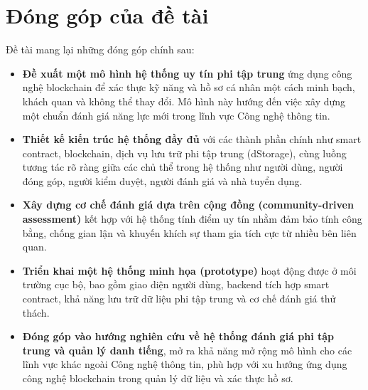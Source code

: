 \section{Đóng góp của đề tài}
Đề tài mang lại những đóng góp chính sau:

\begin{itemize}
  \item \textbf{Đề xuất một mô hình hệ thống uy tín phi tập trung} ứng dụng công nghệ blockchain để xác thực kỹ năng và hồ sơ cá nhân một cách minh bạch, khách quan và không thể thay đổi. Mô hình này hướng đến việc xây dựng một chuẩn đánh giá năng lực mới trong lĩnh vực Công nghệ thông tin.

  \item \textbf{Thiết kế kiến trúc hệ thống đầy đủ} với các thành phần chính như smart contract, blockchain, dịch vụ lưu trữ phi tập trung (dStorage), cùng luồng tương tác rõ ràng giữa các chủ thể trong hệ thống như người dùng, người đóng góp, người kiểm duyệt, người đánh giá và nhà tuyển dụng.

  \item \textbf{Xây dựng cơ chế đánh giá dựa trên cộng đồng (community-driven assessment)} kết hợp với hệ thống tính điểm uy tín nhằm đảm bảo tính công bằng, chống gian lận và khuyến khích sự tham gia tích cực từ nhiều bên liên quan.

  \item \textbf{Triển khai một hệ thống minh họa (prototype)} hoạt động được ở môi trường cục bộ, bao gồm giao diện người dùng, backend tích hợp smart contract, khả năng lưu trữ dữ liệu phi tập trung và cơ chế đánh giá thử thách.

  \item \textbf{Đóng góp vào hướng nghiên cứu về hệ thống đánh giá phi tập trung và quản lý danh tiếng}, mở ra khả năng mở rộng mô hình cho các lĩnh vực khác ngoài Công nghệ thông tin, phù hợp với xu hướng ứng dụng công nghệ blockchain trong quản lý dữ liệu và xác thực hồ sơ.
\end{itemize}